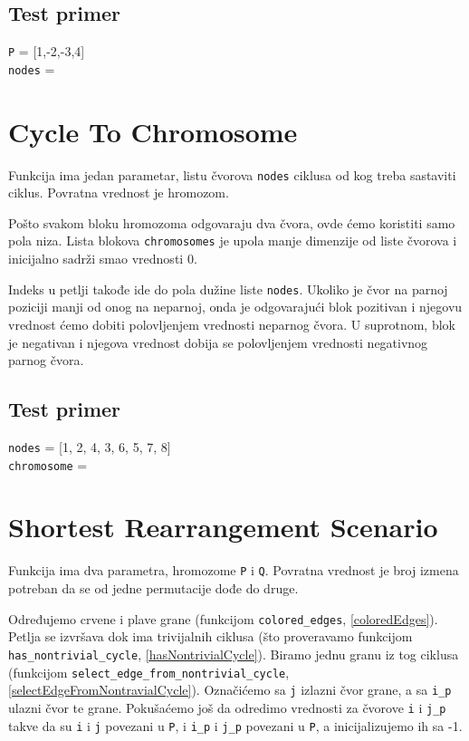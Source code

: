 

\subsection{Test primer}

\noindent\texttt{P} = [1,-2,-3,4]
\\\texttt{nodes} = 

\section{Cycle To Chromosome}
\label{cycleToChrom}

Funkcija ima jedan parametar, listu čvorova \texttt{nodes} ciklusa od kog treba sastaviti ciklus. Povratna vrednost je hromozom.

Pošto svakom bloku hromozoma odgovaraju dva čvora, ovde ćemo koristiti samo pola niza. Lista blokova \texttt{chromosomes} je upola manje dimenzije od liste čvorova i inicijalno sadrži smao vrednosti 0.

Indeks u petlji takođe ide do pola dužine liste \texttt{nodes}. Ukoliko je čvor na parnoj poziciji manji od onog na neparnoj, onda je odgovarajući blok pozitivan i njegovu vrednost ćemo dobiti polovljenjem vrednosti neparnog čvora. U suprotnom, blok je negativan i njegova vrednost dobija se polovljenjem vrednosti negativnog parnog čvora.



\subsection{Test primer}

\noindent\texttt{nodes} = [1, 2, 4, 3, 6, 5, 7, 8]
\\\texttt{chromosome} = 


\section{Shortest Rearrangement Scenario}

Funkcija ima dva parametra, hromozome \texttt{P} i \texttt{Q}. Povratna vrednost je broj izmena potreban da se od jedne permutacije dođe do druge.

Određujemo crvene i plave grane (funkcijom \texttt{colored\_edges}, \ref{coloredEdges}). Petlja se izvršava dok ima trivijalnih ciklusa (što proveravamo funkcijom \texttt{has\_nontrivial\_cycle}, \ref{hasNontrivialCycle}). Biramo jednu granu iz tog ciklusa (funkcijom \texttt{select\_edge\_from\_nontrivial\_cycle}, \ref{selectEdgeFromNontravialCycle}). Označićemo sa \texttt{j} izlazni čvor grane, a sa \texttt{i\_p} ulazni čvor te grane. Pokušaćemo još da odredimo vrednosti za čvorove \texttt{i} i \texttt{j\_p} takve da su \texttt{i} i \texttt{j} povezani u \texttt{P}, i \texttt{i\_p} i \texttt{j\_p} povezani u \texttt{P}, a inicijalizujemo ih sa -1.

